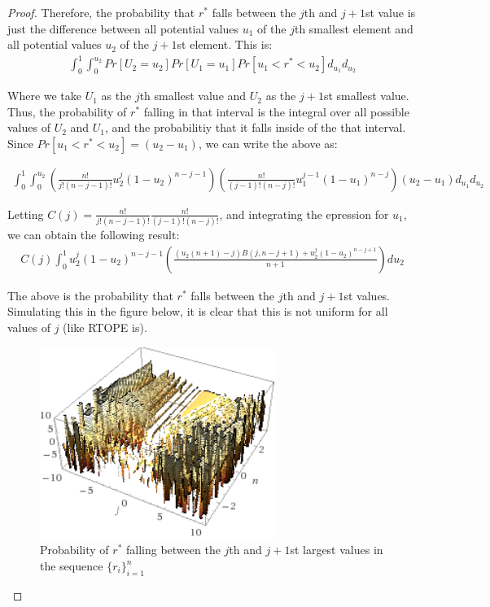 \documentclass[12pt]{article}
\begin{document}
\begin{proof}
    Therefore, the probability that $r^*$ falls between the $j$th and $j+1$st value is just the difference between all potential values $u_1$ of the $j$th smallest element and all potential values $u_2$ of the $j+1$st element. This is:
    \begin{eqnarray}
      \int_{0}^1 \int_0^{u_2} Pr[U_2 = u_2] Pr[U_1 = u_1] Pr[u_1 < r^* < u_2] d_{u_1} d_{u_2}
    \end{eqnarray}

    Where we take $U_1$ as the $j$th smallest value and $U_2$ as the $j+1$st smallest value. Thus, the probability of $r^*$ falling in that interval is the integral over all possible values of $U_2$ and $U_1$, and the probabilitiy that it falls inside of the that interval. Since $Pr[u_1 < r^* < u_2] = (u_2 - u_1)$, we can write the above as:

    \begin{eqnarray}
      \int_{0}^1 \int_0^{u_2} \left( \frac{n!}{j!(n-j-1)!} u_2^j (1 - u_2)^{n-j-1} \right) \left( \frac{n!}{(j-1)!(n-j)!} u_1^{j-1} (1 - u_1)^{n-j} \right) (u_2 - u_1) d_{u_1} d_{u_2}
    \end{eqnarray}

    Letting $C(j) = \frac{n!}{j!(n-j-1)!} \frac{n!}{(j-1)!(n-j)!}$, and integrating the epression for $u_1$, we can obtain the following result:
    \begin{eqnarray}
      C(j) \int_0^1 u_2^j (1 - u_2)^{n-j-1} \left( \frac{(u_2 (n+1) - j) B(j, n-j+1) + u_2^j (1-u_2)^{n-j+1}}{n+1} \right) d u_2
    \end{eqnarray}

    The above is the probability that $r^*$ falls between the $j$th and $j+1$st values. Simulating this in the figure below, it is clear that this is not uniform for all values of $j$ (like RTOPE is).

    \begin{figure}[H]
      \centering
      \includegraphics[width=3in]{ball_result.png}
      \caption{Probability of $r^*$ falling between the $j$th and $j+1$st largest values in the sequence $\{r_i\}_{i=1}^n$}
    \end{figure}
  \end{proof}
\end{document}
